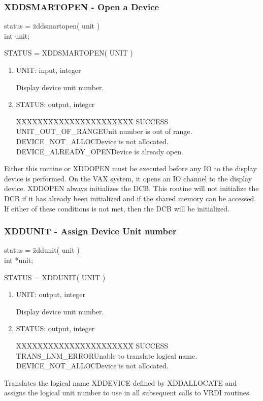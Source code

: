 \subsubsection{XDDSMARTOPEN - Open a Device}
\begin{tabbing}
status = \=zddsmartopen( unit )\\
\>int  unit;\\
\end{tabbing}
STATUS = XDDSMARTOPEN( UNIT )
\begin{enumerate}
\item UNIT:  input, integer

Display device unit number.
\item STATUS:  output, integer
\begin{tabbing}
XXXXXXXXXXXXXXXXXXXXXX\=\kill
SUCCESS\\
UNIT\_OUT\_OF\_RANGE\>Unit number is out of range.\\
DEVICE\_NOT\_ALLOC\>Device is not allocated.\\
DEVICE\_ALREADY\_OPEN\>Device is already open.\\
\end{tabbing}
\end{enumerate}
Either this routine or XDDOPEN must be executed before any IO to
the display device is performed.  On the VAX system, it opens an IO
channel to the display device.  XDDOPEN always initializes the
DCB.  This routine will not initialize the DCB if it has already
been initialized and if the shared memory can be accessed.  If
either of these conditions is not met, then the DCB will be
initialized.
\newpage
\subsubsection{XDDUNIT - Assign Device Unit number}
\begin{tabbing}
status = \=zddunit( unit )\\
\>int  *unit;\\
\end{tabbing}
STATUS = XDDUNIT( UNIT )
\begin{enumerate}
\item UNIT:  output, integer

Display device unit number.
\item STATUS:  output, integer
\begin{tabbing}
XXXXXXXXXXXXXXXXXXXXXX\=\kill
SUCCESS\\
TRANS\_LNM\_ERROR\>Unable to translate logical name.\\
DEVICE\_NOT\_ALLOC\>Device is not allocated.\\
\end{tabbing}
\end{enumerate}
Translates the logical name XDDEVICE defined by XDDALLOCATE
and assigns the logical unit number to use in all subsequent calls
to VRDI routines.
\newpage
